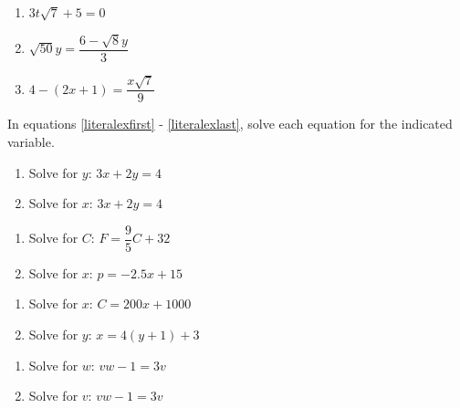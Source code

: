 \documentclass[11pt]{article}
\theoremstyle{definition}  %
\newcounter{HW}
\begin{document}
\begin{multicols}{3}
\begin{enumerate}
\setcounter{enumi}{\value{HW}}

\item $3 t\sqrt{7}  + 5 = 0$  

\item  $\sqrt{50} y = \dfrac{6 - \sqrt{8} y}{3}$  

\item  $4 - (2x+1) = \dfrac{x \sqrt{7}}{9}$ \label{lineareqlast} 

\setcounter{HW}{\value{enumi}}
\end{enumerate}
\end{multicols}


In equations \ref{literalexfirst} - \ref{literalexlast}, solve each equation for the indicated variable.

\begin{multicols}{2}
\begin{enumerate}
\setcounter{enumi}{\value{HW}}
\item  Solve for $y$:  $3x+2y = 4$  \label{literalexfirst}
\item  Solve for $x$:  $3x+2y = 4$ 
\setcounter{HW}{\value{enumi}}
\end{enumerate}
\end{multicols}

\begin{multicols}{2}
\begin{enumerate}
\setcounter{enumi}{\value{HW}}
\item  Solve for $C$: $F = \dfrac{9}{5} C + 32$
\item  Solve for $x$:  $p = -2.5x + 15$ 
\setcounter{HW}{\value{enumi}}
\end{enumerate}
\end{multicols}

\begin{multicols}{2}
\begin{enumerate}
\setcounter{enumi}{\value{HW}}
\item  Solve for $x$: $C = 200x + 1000$ 
\item  Solve for $y$:  $x= 4(y+1) + 3$ 
\setcounter{HW}{\value{enumi}}
\end{enumerate}
\end{multicols}


\begin{multicols}{2}
\begin{enumerate}
\setcounter{enumi}{\value{HW}}
\item  Solve for $w$:  $vw - 1 = 3v$ 
\item  Solve for $v$:   $vw - 1 = 3v$
\setcounter{HW}{\value{enumi}}
\end{enumerate}
\end{multicols}
\end{document}
